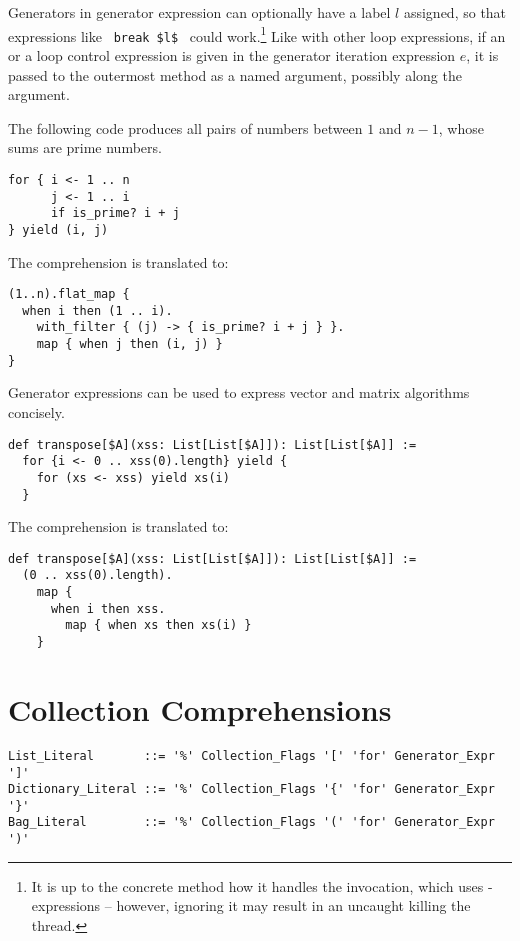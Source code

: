 Generators in generator expression can optionally have a label $l$ assigned, so that expressions like ~\lstinline!break $l$!~ could work.\footnote{It is up to the concrete method how it handles the invocation, which uses - expressions -- however, ignoring it may result in an uncaught  killing the thread.} Like with other loop expressions, if an  or a  loop control expression is given in the generator iteration expression $e$, it is passed to the outermost  method as a named argument, possibly along the  argument. 

\example The following code produces all pairs of numbers between $1$ and $n - 1$, whose sums are prime numbers. 
\begin{lstlisting}
for { i <- 1 .. n
      j <- 1 .. i
      if is_prime? i + j
} yield (i, j)
\end{lstlisting}
The comprehension is translated to:
\begin{lstlisting}
(1..n).flat_map {
  when i then (1 .. i).
    with_filter { (j) -> { is_prime? i + j } }.
    map { when j then (i, j) }
}
\end{lstlisting}

\example Generator expressions can be used to express vector and matrix algorithms concisely.
\begin{lstlisting}[mathescape=false]
def transpose[$A](xss: List[List[$A]]): List[List[$A]] :=
  for {i <- 0 .. xss(0).length} yield {
    for (xs <- xss) yield xs(i)
  }
\end{lstlisting} 
The comprehension is translated to: 
\begin{lstlisting}[mathescape=false]
def transpose[$A](xss: List[List[$A]]): List[List[$A]] := 
  (0 .. xss(0).length).
    map { 
      when i then xss.
        map { when xs then xs(i) }
    }
\end{lstlisting}






\section{Collection Comprehensions}
\label{sec:collection-comprehensions}

\syntax\begin{lstlisting}
List_Literal       ::= '%' Collection_Flags '[' 'for' Generator_Expr ']'
Dictionary_Literal ::= '%' Collection_Flags '{' 'for' Generator_Expr '}'
Bag_Literal        ::= '%' Collection_Flags '(' 'for' Generator_Expr ')'
\end{lstlisting}

